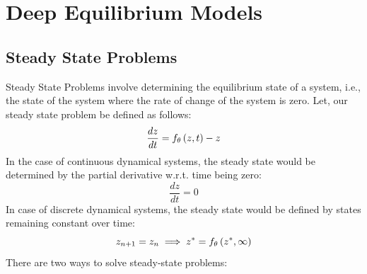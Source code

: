 \chapter{Deep Equilibrium Models}
\label{chapter:deep_equilibrium_models}

\section{Steady State Problems}
\label{sec:steady_state_problems}

Steady State Problems involve determining the equilibrium state of a system, i.e., the state of the system where the rate of change of the system is zero. Let, our steady state problem be defined as follows:
%
\begin{equation}
  \frac{dz}{dt} = f_\theta\left(z, t\right) - z
\end{equation}
%
In the case of continuous dynamical systems, the steady state would be determined by the partial derivative w.r.t. time being zero:
%
\begin{equation}
  \frac{dz}{dt} = 0
\end{equation}
%
In case of discrete dynamical systems, the steady state would be defined by states remaining constant over time:
%
\begin{equation}
  z_{n + 1} = z_n \implies z^* = f_\theta\left(z^*, \infty\right)
\end{equation}
%
There are two ways to solve steady-state problems:
%
